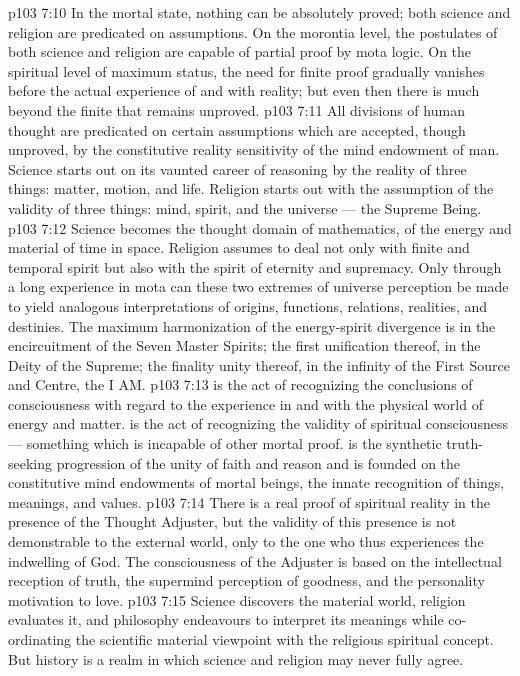 \vs p103 7:10 \pc In the mortal state, nothing can be absolutely proved; both science and religion are predicated on assumptions. On the morontia level, the postulates of both science and religion are capable of partial proof by mota logic. On the spiritual level of maximum status, the need for finite proof gradually vanishes before the actual experience of and with reality; but even then there is much beyond the finite that remains unproved.
\vs p103 7:11 All divisions of human thought are predicated on certain assumptions which are accepted, though unproved, by the constitutive reality sensitivity of the mind endowment of man. Science starts out on its vaunted career of reasoning by  the reality of three things: matter, motion, and life. Religion starts out with the assumption of the validity of three things: mind, spirit, and the universe --- the Supreme Being.
\vs p103 7:12 Science becomes the thought domain of mathematics, of the energy and material of time in space. Religion assumes to deal not only with finite and temporal spirit but also with the spirit of eternity and supremacy. Only through a long experience in mota can these two extremes of universe perception be made to yield analogous interpretations of origins, functions, relations, realities, and destinies. The maximum harmonization of the energy\hyp{}spirit divergence is in the encircuitment of the Seven Master Spirits; the first unification thereof, in the Deity of the Supreme; the finality unity thereof, in the infinity of the First Source and Centre, the I AM.
\vs p103 7:13 \pc {} is the act of recognizing the conclusions of consciousness with regard to the experience in and with the physical world of energy and matter.  is the act of recognizing the validity of spiritual consciousness --- something which is incapable of other mortal proof.  is the synthetic truth\hyp{}seeking progression of the unity of faith and reason and is founded on the constitutive mind endowments of mortal beings, the innate recognition of things, meanings, and values.
\vs p103 7:14 \pc There is a real proof of spiritual reality in the presence of the Thought Adjuster, but the validity of this presence is not demonstrable to the external world, only to the one who thus experiences the indwelling of God. The consciousness of the Adjuster is based on the intellectual reception of truth, the supermind perception of goodness, and the personality motivation to love.
\vs p103 7:15 Science discovers the material world, religion evaluates it, and philosophy endeavours to interpret its meanings while co\hyp{}ordinating the scientific material viewpoint with the religious spiritual concept. But history is a realm in which science and religion may never fully agree.

